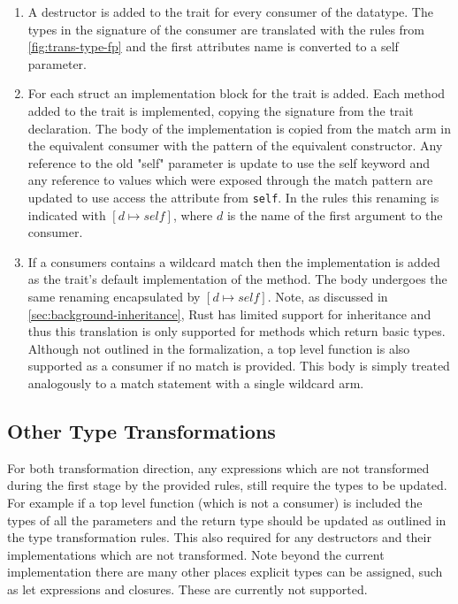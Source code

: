 \documentclass[ oneside,%
                    author={James Elgar},
                    degree={MEng},
                     title={Bidirectional transformer between functional and \\ object-oriented programming in Rust},
                  subtitle={}]{dissertation}
\begin{document}
\begin{enumerate}
    \item A destructor is added to the trait for every consumer of the datatype. The types in the signature of the consumer are translated with the rules from \autoref{fig:trans-type-fp} and the first attributes name is converted to a self parameter.
    \item For each struct an implementation block for the trait is added. Each method added to the trait is implemented, copying the signature from the trait declaration. The body of the implementation is copied from the match arm in the equivalent consumer with the pattern of the equivalent constructor. Any reference to the old "self" parameter is update to use the self keyword and any reference to values which were exposed through the match pattern are updated to use access the attribute from \verb|self|. In the rules this renaming is indicated with $[d \mapsto self]$, where $d$ is the name of the first argument to the consumer.
    \item If a consumers contains a wildcard match then the implementation is added as the trait's default implementation of the method. The body undergoes the same renaming encapsulated by $[d \mapsto self]$. Note, as discussed in \autoref{sec:background-inheritance}, Rust has limited support for inheritance and thus this translation is only supported for methods which return basic types. Although not outlined in the formalization, a top level function is also supported as a consumer if no match is provided. This body is simply treated analogously to a match statement with a single wildcard arm.
\end{enumerate}

\subsection{Other Type Transformations}

For both transformation direction, any expressions which are not transformed during the first stage by the provided rules, still require the types to be updated. For example if a top level function (which is not a consumer) is included the types of all the parameters and the return type should be updated as outlined in the type transformation rules. This also required for any destructors and their implementations which are not transformed. Note beyond the current implementation there are many other places explicit types can be assigned, such as let expressions and closures. These are currently not supported.
\end{document}
